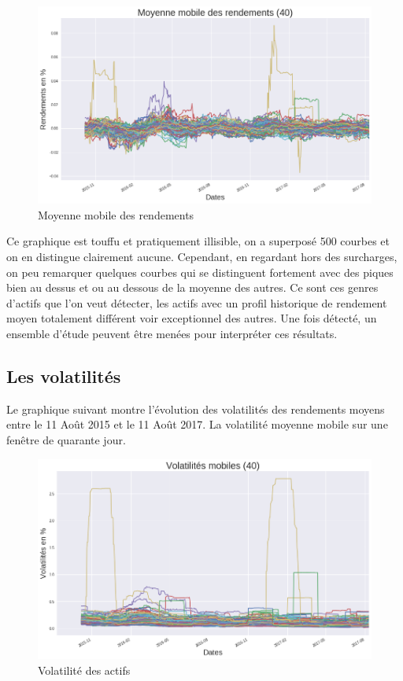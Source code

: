 \begin{figure}[H]
\centering
\caption{Moyenne mobile des rendements}
   \includegraphics[scale=0.5]{img/rendements.png}
\end{figure}

Ce graphique est touffu et pratiquement illisible, on a superposé 500 courbes et on en distingue clairement aucune. Cependant, en regardant hors des surcharges, on peu remarquer quelques courbes qui se distinguent fortement avec des piques bien au dessus et ou au dessous de la moyenne des autres. Ce sont ces genres d'actifs que l'on veut détecter, les actifs avec un profil historique de rendement moyen totalement différent voir exceptionnel des autres. Une fois détecté, un ensemble d'étude peuvent être menées pour interpréter ces résultats.

\subsection{Les volatilités}

Le graphique suivant montre l'évolution des volatilités des rendements moyens entre le 11 Août 2015 et le 11 Août 2017. La volatilité moyenne mobile sur une fenêtre de quarante jour.

\begin{figure}[H]
\centering
\caption{Volatilité des actifs}
   \includegraphics[scale=0.5]{img/volatilites.png}
\end{figure}

